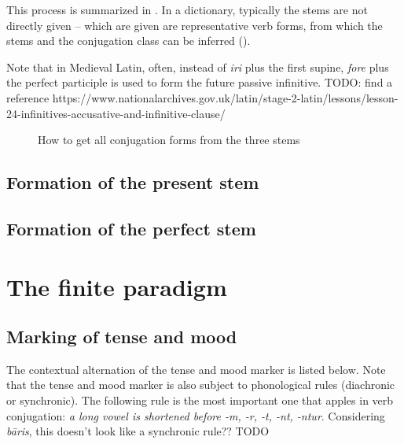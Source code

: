 \documentclass[a4paper, oneside]{report}
\newcommand{\form}[1]{\emph{#1}}
\begin{document}
This process is summarized in .
In a dictionary, 
typically the stems are not directly given 
-- which are given are representative verb forms,
from which the stems and the conjugation class can be inferred 
().

Note that in Medieval Latin, often,
instead of \form{iri} plus the first supine,
\form{fore} plus the perfect participle is used to form the future passive infinitive.
TODO: find a reference https://www.nationalarchives.gov.uk/latin/stage-2-latin/lessons/lesson-24-infinitives-accusative-and-infinitive-clause/

\begin{sidewaysfigure}
    \centering
    
    \caption{How to get all conjugation forms from the three stems}
    \label{fig:stem-to-form}
\end{sidewaysfigure}

\subsection{Formation of the present stem}



\subsection{Formation of the perfect stem}\label{sec:verb-inflection.stem.perfect}

\section{The finite paradigm}\label{sec:finite-paradigm}

\subsection{Marking of tense and mood}\label{sec:tense-mood-marking}

The contextual alternation of the tense and mood marker is listed below.
Note that the tense and mood marker is also subject to phonological rules 
(diachronic or synchronic).
The following rule is the most important one that apples in verb conjugation:
\emph{a long vowel is shortened before \form{-m}, \form{-r}, \form{-t}, \form{-nt}, \form{-ntur}}.
Considering \form{b\={a}ris},
this doesn't look like a synchronic rule?? TODO
\end{document}
